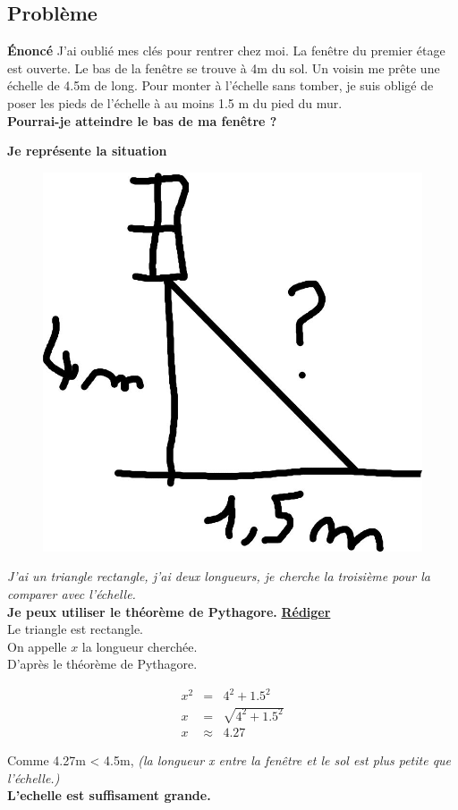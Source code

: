 \documentclass[12pt]{article}
\begin{document}
\subsection*{Problème}

\textbf{Énoncé} J'ai oublié mes clés pour rentrer chez moi. La fenêtre du premier étage est ouverte.
Le bas de la fenêtre se trouve à 4m du sol. Un voisin me prête une échelle de 4.5m de long.
Pour monter à l'échelle sans tomber, je suis obligé de poser les pieds de l'échelle à au moins 1.5 m du pied du mur.\\
\textbf{Pourrai-je atteindre le bas de ma fenêtre ?}

\begin{multicols}{2}

	\textbf{Je représente la situation}

	\begin{figure}[H]
		\centering
		\includegraphics[width=0.5\linewidth]{4x1-pythagore/sources/probleme.jpg}
	\end{figure}

	\textit{J'ai un triangle rectangle, j'ai deux longueurs, je cherche la troisième pour la comparer avec l'échelle.}\\
	\textbf{Je peux utiliser le théorème de Pythagore.}
	\vspace{1cm}
	\underline{\textbf{Rédiger}}\\
	Le triangle est rectangle.\\
	On appelle $x$ la longueur cherchée.\\
	D'après le théorème de Pythagore.

	\begin{eqnarray*}
		x^2 &=& 4^2 + 1.5^2 \\
		x   &=& \sqrt{4^2 + 1.5^2} \\
		x   &\approx& 4.27
	\end{eqnarray*}

	Comme 4.27m < 4.5m, \textit{(la longueur x entre la fenêtre et le sol est plus petite que l'échelle.)}\\
	\textbf{L'echelle est suffisament grande.}
\end{multicols}
\end{document}
